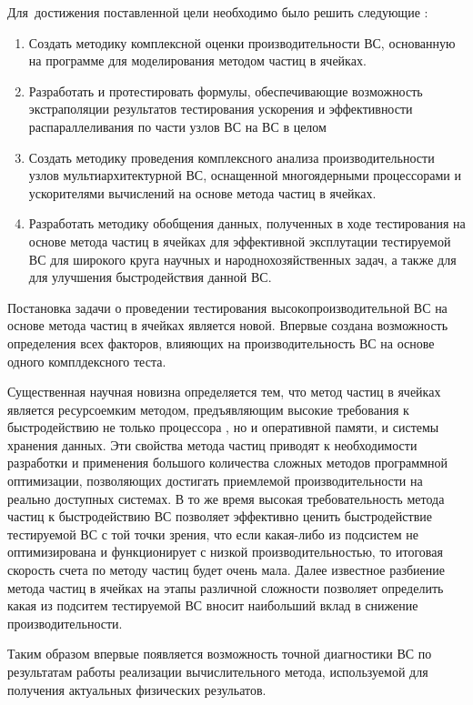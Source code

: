 Для~достижения поставленной цели необходимо было решить следующие {\tasks}:
\begin{enumerate}
  \item Создать методику комплексной оценки производительности ВС, основанную на программе для моделирования методом частиц в ячейках.
  \item Разработать и протестировать формулы, обеспечивающие возможность экстраполяции результатов тестирования ускорения и эффективности распараллеливания по части узлов ВС на ВС в целом
  \item Создать методику проведения комплексного анализа производительности узлов мультиархитектурной ВС, оснащенной многоядерными процессорами и ускорителями вычислений на основе метода частиц в ячейках.
  \item Разработать методику обобщения данных, полученных в ходе тестирования на основе метода частиц в ячейках для эффективной эксплутации тестируемой ВС для широкого круга научных и народнохозяйственных задач, а также для для улучшения быстродействия данной ВС. 
\end{enumerate}


{\novelty}
Постановка задачи о проведении тестирования высокопроизводительной ВС на основе метода частиц в ячейках является новой. Впервые создана возможность определения всех факторов, влияющих на производительность ВС на основе одного комплдексного теста. 

Существенная научная новизна определяется тем, что метод частиц в ячейках является ресурсоемким методом, предъявляющим высокие требования к быстродействию не только процессора , но и оперативной памяти, и системы хранения данных. Эти свойства метода частиц приводят к необходимости разработки и применения большого количества сложных методов программной оптимизации, позволяющих достигать приемлемой производительности на реально доступных системах. В то же время высокая требовательность метода частиц к быстродействию ВС позволяет эффективно ценить быстродействие тестируемой ВС с той точки зрения, что если какая-либо из подсистем не оптимизирована и функционирует с низкой производительностью, то итоговая скорость счета по методу частиц будет очень мала. Далее известное разбиение метода частиц в ячейках на этапы различной сложности позволяет определить какая из подситем тестируемой ВС вносит наибольший вклад в снижение производительности. 

Таким образом впервые появляется возможность точной диагностики ВС по результатам работы реализации вычислительного метода, используемой для получения актуальных физических резульатов.   

